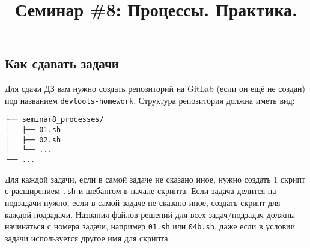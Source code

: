 \documentclass{article}
\begin{document}
\title{Семинар \#8: Процессы. Практика. \vspace{-5ex}}\date{}\maketitle
\subsection*{Как сдавать задачи}
Для сдачи ДЗ вам нужно создать репозиторий на GitLab (если он ещё не создан) под названием \texttt{devtools-homework}. Структура репозитория должна иметь вид:
\begin{center}
\begin{BVerbatim}
├── seminar8_processes/
│   ├── 01.sh
│   ├── 02.sh
│   └── ...
└── ...
\end{BVerbatim}
\end{center}
Для каждой задачи, если в самой задаче не сказано иное, нужно создать 1 скрипт с расширением \texttt{.sh} и шебангом в начале скрипта. Если задача делится на подзадачи нужно, если в самой задаче не сказано иное, создать скрипт для каждой подзадачи. Названия файлов решений для всех задач/подзадач должны начинаться с номера задачи, например \texttt{01.sh} или \texttt{04b.sh}, даже если в условии задачи используется другое имя для скрипта.  \\
\end{document}
